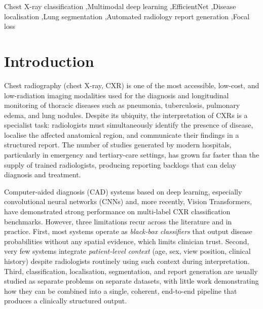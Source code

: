 \documentclass[preprint,12pt,authoryear]{elsarticle}
\begin{document}
\begin{frontmatter}
\begin{keyword}
Chest X-ray classification \sep Multimodal deep learning \sep EfficientNet \sep Disease localisation \sep Lung segmentation \sep Automated radiology report generation \sep Focal loss
\end{keyword}

\end{frontmatter}

\section{Introduction}
\label{sec:intro}

Chest radiography (chest X-ray, CXR) is one of the most accessible, low-cost, and low-radiation imaging modalities used for the diagnosis and longitudinal monitoring of thoracic diseases such as pneumonia, tuberculosis, pulmonary edema, and lung nodules. Despite its ubiquity, the interpretation of CXRs is a specialist task: radiologists must simultaneously identify the presence of disease, localise the affected anatomical region, and communicate their findings in a structured report. The number of studies generated by modern hospitals, particularly in emergency and tertiary-care settings, has grown far faster than the supply of trained radiologists, producing reporting backlogs that can delay diagnosis and treatment.

Computer-aided diagnosis (CAD) systems based on deep learning, especially convolutional neural networks (CNNs) and, more recently, Vision Transformers, have demonstrated strong performance on multi-label CXR classification benchmarks. However, three limitations recur across the literature and in practice. First, most systems operate as \emph{black-box classifiers} that output disease probabilities without any spatial evidence, which limits clinician trust. Second, very few systems integrate \emph{patient-level context} (age, sex, view position, clinical history) despite radiologists routinely using such context during interpretation. Third, classification, localisation, segmentation, and report generation are usually studied as separate problems on separate datasets, with little work demonstrating how they can be combined into a single, coherent, end-to-end pipeline that produces a clinically structured output.
\end{document}
